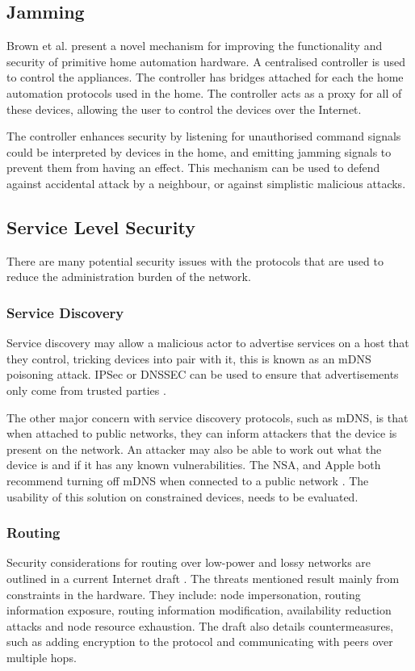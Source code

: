 \documentclass[10pt,journal,compsoc]{IEEEtran}
\begin{document}
\subsection{Jamming}
Brown et al. \cite{Brown2013} present a novel mechanism for improving the
functionality and security of primitive home automation hardware. A centralised
controller is used to control the appliances. The controller has bridges
attached for each the home automation protocols used in the home. The
controller acts as a proxy for all of these devices, allowing the user to
control the devices over the Internet. 

The controller enhances security by listening for unauthorised command signals
could be interpreted by devices in the home, and emitting jamming signals to
prevent them from having an effect. This mechanism can be used to defend
against accidental attack by a neighbour, or against simplistic malicious
attacks. 

\subsection{Service Level Security}
There are many potential security issues with the protocols that are used to
reduce the administration burden of the network. 

\subsubsection{Service Discovery}
Service discovery may allow a malicious actor to advertise services on a host
that they control, tricking devices into pair with it, this is known as an mDNS
poisoning attack. IPSec or DNSSEC can be used to ensure that advertisements
only come from trusted parties \cite{Cheshire2013}. 

The other major concern with service discovery protocols, such as mDNS, is that
when attached to public networks, they can inform attackers that the device is
present on the network. An attacker may also be able to work out what the
device is and if it has any known vulnerabilities.  The NSA, and Apple both
recommend turning off mDNS when connected to a public network
\cite{NSAMacHardening} \cite{MacConfig}. The usability of this solution on
constrained devices, needs to be evaluated. 

\subsubsection{Routing}
Security considerations for routing over low-power and lossy networks are
outlined in a current Internet draft \cite{Tsao2014}. The threats mentioned
result mainly from constraints in the hardware. They include: node
impersonation, routing information exposure, routing information modification,
availability reduction attacks and node resource exhaustion. The draft also
details countermeasures, such as adding encryption to the protocol and
communicating with peers over multiple hops.
\end{document}
